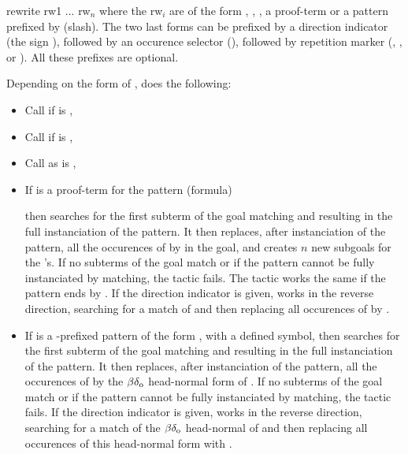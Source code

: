 \addAuto
{rewrite}
{rw1 ... rw${}_n$ where the rw${}_i$ are of the form \ec{//},
\ec{/=}, \ec{//=}, a proof-term or a pattern prefixed by \ec{/}
(slash). The two last forms can be prefixed by a direction indicator (the sign
\ec{-}), followed by an occurence selector (),
followed by repetition marker (\ec{!}, ,  or ). All
these prefixes are optional.}
{Depending on the form of , \tacname{}  does the following:
  \begin{itemize}
   \item Call  if  is \ec{//},
   \item Call  if  is \ec{/=},
   \item Call  as  is \ec{//=},
   \item If  is a proof-term for the pattern (formula)
     \begin{center}
     \end{center}
     \noindent then \tacname{} searches for the first subterm of the goal
     matching  and resulting in the full instanciation of the pattern.
     It then replaces, after instanciation of the pattern, all the occurences
     of  by  in the goal, and creates $n$ new subgoals for the
     's. If no subterms of the goal match  or if the pattern
     cannot be fully instanciated by matching, the tactic fails.
     The tactic works the same if the pattern ends by . If the
     direction indicator \ec{-} is given, \tacname{} works in the reverse
     direction, searching for a match of  and then replacing all
     occurences of  by .
   \item If  is a \ec{/}-prefixed pattern of the form ,
     with  a defined symbol, then \tacname{} searches for the first subterm
     of the goal matching  and resulting in the full instanciation
     of the pattern. It then replaces, after instanciation of the pattern, all
     the occurences of  by the $\beta\delta_{\rm o}$ head-normal form
     of . If no subterms of the goal match  or
     if the pattern cannot be fully instanciated by matching, the tactic fails. If the
     direction indicator \ec{-} is given, \tacname{} works in the reverse
     direction, searching for a match of the $\beta\delta_{\rm o}$ head-normal
     of  and then replacing all occurences of this head-normal
     form with .
  \end{itemize}
  
}
